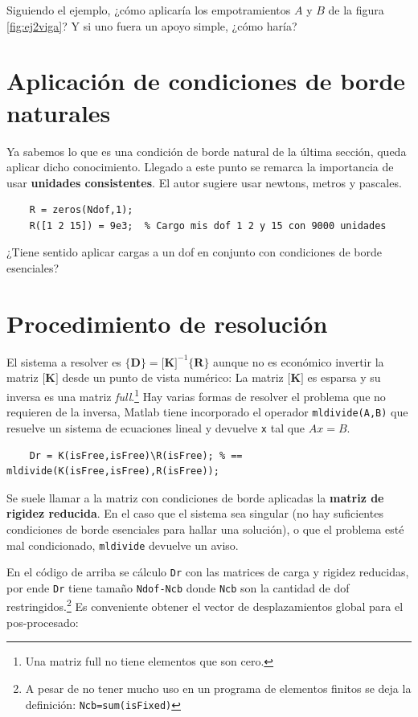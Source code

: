 \documentclass[11pt, a4paper,titlepage]{article}
\newcommand{\rmfont}[1]{{\fontfamily{ptm}\selectfont%
#1}}
\newcommand{\Matlab}{\rmfont{\sc Matlab}}
\newcommand{\Mme}[1]{\boldsymbol{[}\mathbf{#1} \boldsymbol{]}}
\newcommand{\Cme}[1]{\boldsymbol{\{ }\mathbf{#1} \boldsymbol{\}} }
\newcommand{\CD}{\Cme{D}}
\newcommand{\MK}{\Mme{K}}
\newcommand{\CR}{\Cme{R}}
\begin{document}
Siguiendo el ejemplo, ¿cómo aplicaría los empotramientos $A$ y $B$ de la figura \ref{fig:ej2viga}? Y si uno fuera un apoyo simple, ¿cómo haría? 



\section{Aplicación de condiciones de borde naturales}
Ya sabemos lo que es una condición de borde natural de la última sección, queda aplicar dicho conocimiento. Llegado a este punto se remarca la importancia de usar \textbf{unidades consistentes}. El autor sugiere usar newtons, metros y pascales.  

\begin{verbatim}
    R = zeros(Ndof,1);
    R([1 2 15]) = 9e3;  % Cargo mis dof 1 2 y 15 con 9000 unidades
\end{verbatim}

¿Tiene sentido aplicar cargas a un dof en conjunto con condiciones de borde esenciales?

\section{Procedimiento de resolución}
El sistema a resolver es $\CD=\MK^{-1}\CR$ aunque no es económico invertir la matriz $\MK$ desde un punto de vista numérico: La matriz $\MK$ es esparsa y su inversa es una matriz \textit{full}.\footnote{Una matriz full no tiene elementos que son cero.} Hay varias formas de resolver el problema que no requieren de la inversa, \Matlab{} tiene incorporado el operador \texttt{mldivide(A,B)} que resuelve un sistema de ecuaciones lineal y devuelve \texttt{x} tal que $Ax=B$. 

\begin{verbatim}
    Dr = K(isFree,isFree)\R(isFree); % == mldivide(K(isFree,isFree),R(isFree));
\end{verbatim}
Se suele llamar a la matriz con condiciones de borde aplicadas la \textbf{matriz de rigidez reducida}. En el caso que el sistema sea singular (no hay suficientes condiciones de borde esenciales para hallar una solución), o que el problema esté mal condicionado, \texttt{mldivide} devuelve un aviso.  

En el código de arriba se cálculo \texttt{Dr} con las matrices de carga y rigidez reducidas, por ende \texttt{Dr} tiene tamaño \texttt{Ndof-Ncb} donde \texttt{Ncb} son la cantidad de dof restringidos.\footnote{A pesar de no tener mucho uso en un programa de elementos finitos se deja la definición: \texttt{Ncb=sum(isFixed)}} Es conveniente obtener el vector de desplazamientos global para el pos-procesado:
\end{document}

